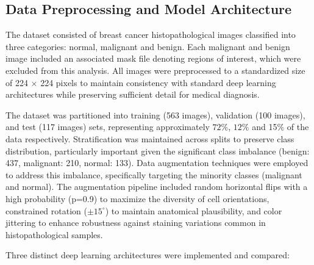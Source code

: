 \subsection{Data Preprocessing and Model Architecture}
The dataset consisted of breast cancer histopathological images classified into three categories: normal, malignant and benign. Each malignant and benign image included an associated mask file denoting regions of interest, which were excluded from this analysis. All images were preprocessed to a standardized size of 224 \( \times \) 224 pixels to maintain consistency with standard deep learning architectures while preserving sufficient detail for medical diagnosis.

The dataset was partitioned into training (563 images), validation (100 images), and test (117 images) sets, representing approximately $72\%$, $12\%$ and 15$\%$ of the data respectively. Stratification was maintained across splits to preserve class distribution, particularly important given the significant class imbalance (benign: 437, malignant: 210, normal: 133). Data augmentation techniques were employed to address this imbalance, specifically targeting the minority classes (malignant and normal). The augmentation pipeline included random horizontal flips with a high probability (p=0.9) to maximize the diversity of cell orientations, constrained rotation ($\pm15^{\circ}$) to maintain anatomical plausibility, and color jittering to enhance robustness against staining variations common in histopathological samples.

Three distinct deep learning architectures were implemented and compared:

